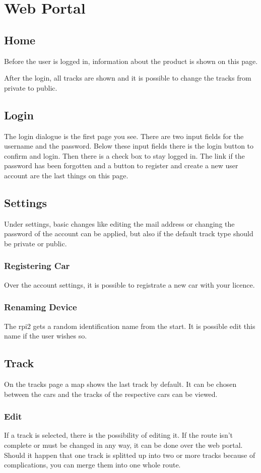 \section{Web Portal}
\subsection{Home}
Before the user is logged in, information about the product is shown on this page.

After the login, all tracks are shown and it is possible to change the tracks from private to public.
\subsection{Login}
The login dialogue is the first page you see. There are two input fields for the username and the password. Below these input fields there is the login button to confirm and login. Then there is a check box to stay logged in.
The link if the password has been forgotten and a button to register and create a new user account are the last things on this page.
\subsection{Settings}
Under settings, basic changes like editing the mail address or changing the password of the account can be applied, but also if the default track type should be private or public.
\subsubsection{Registering Car}
Over the account settings, it is possible to registrate a new car with your licence.
\subsubsection{Renaming Device}
The \gls{rpi2} gets a random identification name from the start. It is possible edit this name if the user wishes so.
\subsection{Track}
On the tracks page a map shows the last track by default. It can be chosen between the cars and the tracks of the respective cars can be viewed.
\subsubsection{Edit}
If a track is selected, there is the possibility of editing it. If the route isn’t complete or must be changed in any way, it can be done over the web portal. Should it happen that one track is splitted up into two or more tracks because of complications, you can merge them into one whole route.
